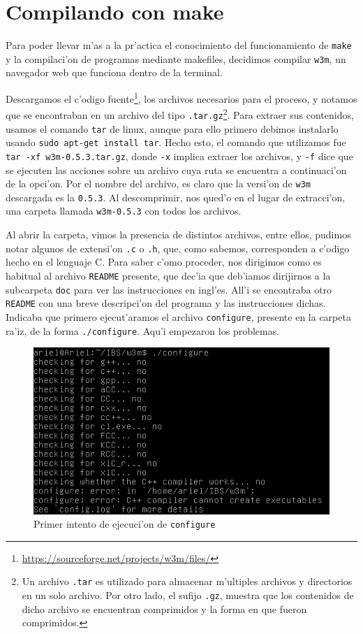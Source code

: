 \documentclass[11pt]{article}
\begin{document}
		
	\section{Compilando con make}
	
		Para poder llevar m'as a la pr'actica el conocimiento del funcionamiento de \texttt{make} y la compilaci'on de programas mediante makefiles, decidimos compilar \texttt{w3m}, un navegador web que funciona dentro de la terminal.
		
		Descargamos el c'odigo fuente\footnote{\url{https://sourceforge.net/projects/w3m/files/}}, los archivos necesarios para el proceso, y notamos que se encontraban en un archivo del tipo \texttt{.tar.gz}\footnote{Un archivo \texttt{.tar} es utilizado para almacenar m'ultiples archivos y directorios en un solo archivo. Por otro lado, el sufijo \texttt{.gz}, muestra que los contenidos de dicho archivo se encuentran comprimidos y la forma en que fueron comprimidos.}. Para extraer sus contenidos, usamos el comando \texttt{tar} de linux, aunque para ello primero debimos instalarlo usando \texttt{sudo apt-get install tar}. Hecho esto, el comando que utilizamos fue \texttt{tar -xf w3m-0.5.3.tar.gz}, donde \texttt{-x} implica extraer los archivos, y \texttt{-f} dice que se ejecuten las acciones sobre un archivo cuya ruta se encuentra a continuaci'on de la opci'on. Por el nombre del archivo, es claro que la versi'on de \texttt{w3m} descargada es la \texttt{0.5.3}. Al descomprimir, nos qued'o en el lugar de extracci'on, una carpeta llamada \texttt{w3m-0.5.3} con todos los archivos.
		
		Al abrir la carpeta, vimos la presencia de distintos archivos, entre ellos, pudimos notar algunos de extensi'on \texttt{.c} o \texttt{.h}, que, como sabemos, corresponden a c'odigo hecho en el lenguaje C. Para saber c'omo proceder, nos dirigimos como es habitual al archivo \texttt{README} presente, que dec'ia que deb'iamos dirijirnos a la subcarpeta \texttt{doc} para ver las instrucciones en ingl'es. All'i se encontraba otro \texttt{README} con una breve descripci'on del programa y las instrucciones dichas. Indicaba que primero ejecut'aramos el archivo \texttt{configure}, presente en la carpeta ra'iz, de la forma \texttt{./configure}. Aqu'i empezaron los problemas.
		
		\begin{figure}[H]
			\centering
			\includegraphics[width=.8\linewidth]{Images/Compile_w3m/g++_missing}
			\caption{Primer intento de ejecuci'on de \texttt{configure}}
			\label{fig:g++_missing}
		\end{figure}
		
\end{document}
